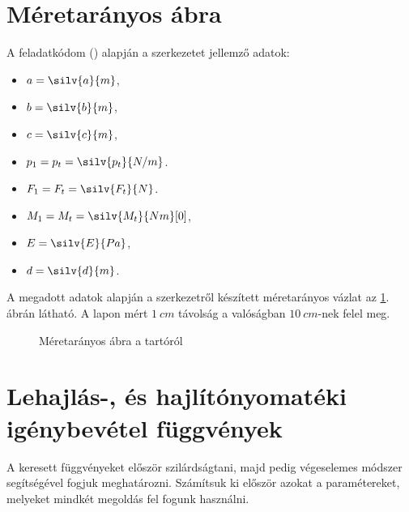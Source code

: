 \documentclass[a4paper, 12pt]{scrartcl}
\begin{document}

\allowdisplaybreaks

\section{Méretarányos ábra} %

A feladatkódom (\texttt{})
alapján a szerkezetet jellemző adatok:
\begin{multicols}{3}
  \begin{itemize}
    \item $a = \silv{a}{m}$,
    \item $b = \silv{b}{m}$,
    \item $c = \silv{c}{m}$,

    \item $p_1 = p_t = \silv{p_t}{N/m}$.
    \item $F_1 = F_t = \silv{F_t}{N}$.
    \item $M_1 = M_t = \silv{M_t}{Nm}[0]$,

    \item $\siplaces{0}\sisci{}E = \silv{E}{Pa}$,
    \item $d = \silv{d}{m}$.
  \end{itemize}
\end{multicols}

A megadott adatok alapján a szerkezetről készített méretarányos vázlat az
\ref{fig:construction}. ábrán látható. A lapon mért $\SI{1}{cm}$ távolság
a valóságban $\SI{10}{cm}$-nek felel meg.

\begin{figure}[H]
  \centering
  
  \vspace{-2mm}
  \caption{Méretarányos ábra a tartóról}
  \label{fig:construction}
\end{figure}
\vspace{-10mm}

\section{Lehajlás-, és hajlítónyomatéki igénybevétel függvények} %

A keresett függvényeket először szilárdságtani, majd pedig végeselemes
módszer segítségével fogjuk meghatározni. Számítsuk ki először azokat a
paramétereket, melyeket mindkét megoldás fel fogunk használni.
\end{document}
